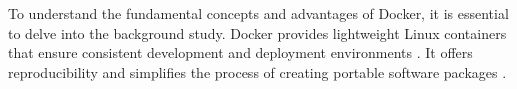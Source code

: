 To understand the fundamental concepts and advantages of Docker, it is essential to delve into the background study. Docker provides lightweight Linux containers that ensure consistent development and deployment environments \citep{merkel2014docker}. It offers reproducibility and simplifies the process of creating portable software packages \citep{boettiger2015introduction}. 